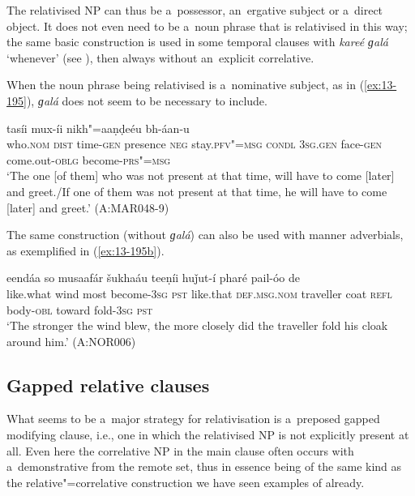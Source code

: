 

The relativised NP can thus be a~possessor, an~ergative subject or a~direct object. It does not even need to be a~noun phrase that is relativised in this way; the same basic construction is used in some temporal clauses with \textit{kareé ɡalá} `whenever' (see ), then always without an~explicit correlative.


When the noun phrase being relativised is a~nominative subject, as in (\ref{ex:13-195}), \textit{ɡalá} does not seem to be necessary to include. 

\begin{exe}
\ex
\label{ex:13-195}
 tasíi mux-íi nikh"=aaṇḍeéu bh-áan-u \\
who.\textsc{nom} \textsc{dist} time-\textsc{gen} presence \textsc{neg} stay.\textsc{pfv"=msg}  \textsc{condl } \textsc{3sg.gen} face-\textsc{gen} come.out-\textsc{oblg} become-\textsc{prs"=msg} \\
\glt `The one [of them] who was not present at that time, will have to come [later] and greet./If one of them was not present at that time, he will have to come [later] and greet.' (A:MAR048-9)
\end{exe}

The same construction (without \textit{ɡalá}) can also be used with manner adverbials, as exemplified in (\ref{ex:13-195b}).

\begin{exe}
\ex
\label{ex:13-195b}
 eendáa so musaafár šukhaáu teeṇíi huǰut-í pharé pail-óo de\\
like.what wind most become-\textsc{3sg} \textsc{pst} like.that \textsc{def.msg.nom} traveller coat \textsc{refl} body-\textsc{obl} toward fold-\textsc{3sg} \textsc{pst} \\
\glt `The stronger the wind blew, the more closely did the traveller fold his cloak around him.' (A:NOR006)
\end{exe}


\subsection{Gapped relative clauses}
\label{subsec:13-6-3}


What seems to be a~major strategy for relativisation is a~preposed gapped modifying clause, i.e., one in which the relativised NP is not explicitly present at all. Even here the correlative NP in the main clause often occurs with a~demonstrative from the remote set, thus in essence being of the same kind as the relative"=correlative construction we have seen examples of already.


